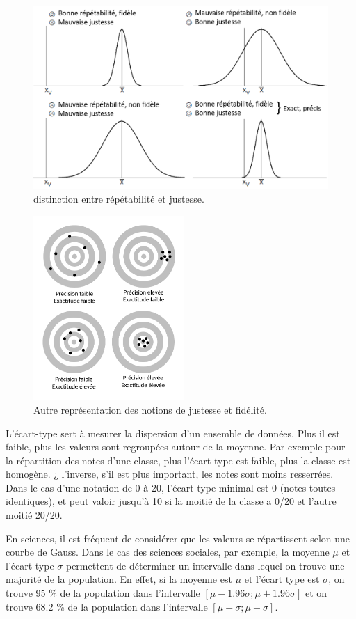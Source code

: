 \begin{figure}
\centering
\includegraphics[height=7cm]{assets/figures/3_8_distinction_entre_repetabiite_et_justesse.PNG}
\caption{distinction entre répétabilité et justesse.}
\label{fig:distinction_entre_repetabiite_et_justesse}
\end{figure}

\begin{figure}
\centering
\includegraphics[height=7cm]{assets/figures/juste-fidèle-précis.pdf}
\caption{Autre représentation des notions de justesse et fidélité.}
\label{fig:juste_fidele_precis}
\end{figure}

L'écart-type sert à mesurer la dispersion d'un ensemble de données. Plus il est faible, plus les valeurs sont regroupées autour de la moyenne. Par exemple pour la répartition des notes d'une classe, plus l'écart type est faible, plus la classe est homogène. ¿ l'inverse, s'il est plus important, les notes sont moins resserrées. Dans le cas d'une notation de 0 à 20, l'écart-type minimal est 0 (notes toutes identiques), et peut valoir jusqu'à 10 si la moitié de la classe a 0/20 et l'autre moitié 20/20.

En sciences, il est fréquent de considérer que les valeurs se répartissent selon une courbe de Gauss. Dans le cas des sciences sociales, par exemple, la moyenne $\mu$ et l'écart-type $\sigma$ permettent de déterminer un intervalle dans lequel on trouve une majorité de la population. En effet, si la moyenne est $\mu$ et l'écart type est $\sigma$, on trouve 95 \% de la population dans l'intervalle $[ \mu - 1.96 \sigma ; \mu + 1.96 \sigma ]$ et on trouve 68.2 \% de la population dans l'intervalle $[ \mu - \sigma ; \mu + \sigma ]$.

